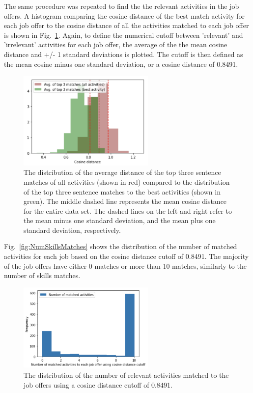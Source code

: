 The same procedure was repeated to find the the relevant activities in the job offers. A histogram comparing the cosine distance of the best match activity for each job offer to the cosine distance of all the activities matched to each job offer is shown in Fig.~\ref{fig:ActivityHist1}. Again, to define the numerical cutoff between 'relevant' and 'irrelevant' activities for each job offer, the average of the the mean cosine distance and +/- 1 standard deviations is plotted. The cutoff is then defined as the mean cosine minus one standard deviation, or a cosine distance of 0.8491.

\begin{figure}[htbp]
  \centering
    \includegraphics[width=0.6\textwidth]{figures/ActivityHist1.pdf}
    \caption[The distribution of the average distance of the top three sentence matches of all activities compared to the top three sentence matches to the best activities]{
     The distribution of the average distance of the top three sentence matches of all activities (shown in red) compared to the distribution of the top three sentence matches to the best activities (shown in green). The middle dashed line represents the mean cosine distance for the entire data set. The dashed lines on the left and right refer to the mean minus one standard deviation, and the mean plus one standard deviation, respectively. 
    }
\label{fig:ActivityHist1}
\end{figure}

Fig.~\ref{fig:NumSkillsMatches} shows the distribution of the number of matched activities for each job based on the cosine distance cutoff of 0.8491. The majority of the job offers have either 0 matches or more than 10 matches, similarly to the number of skills matches.

\begin{figure}[htbp]
  \centering
    \includegraphics[width=0.6\textwidth]{figures/NumActivitiesMatches.pdf}
    \caption{
    The distribution of the number of relevant activities matched to the job offers using a cosine distance cutoff of 0.8491. 
    }
\label{fig:NumActivityMatches}
\end{figure}

